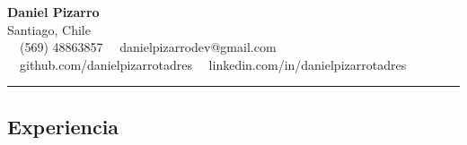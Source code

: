 \documentclass[11pt,letterpaper]{article}
\begin{document}
\begin{center}
	{\LARGE \textbf{Daniel Pizarro}}\\
	Santiago, Chile
	\vspace{0.05cm}
	\\
	\raisebox{-0.2\height} {\Large \faPhoneSquare} \ \  (569) 48863857 \hfill\raisebox{-0.2\height}{\Large \faEnvelopeSquare} \ \ danielpizarrodev@gmail.com \hfill \raisebox{-0.2\height}{\Large \faGithubSquare} \ \ github.com/danielpizarrotadres \hfill \raisebox{-0.2\height}{\Large \faLinkedinSquare} \ \ linkedin.com/in/danielpizarrotadres
\end{center}

\hrule
\vspace{-1em}
\subsection*{\Large Experiencia}
\end{document}
